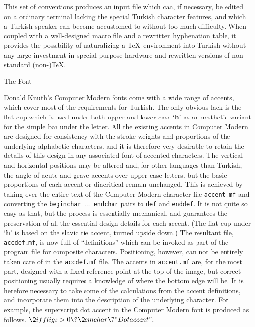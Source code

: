 This set of conventions produces an input file which can, if
necessary, be edited on a ordinary terminal lacking the special
Turkish character features, and which a Turkish speaker can become
accustomed to without too much difficulty.  When coupled with a
well-designed macro file and a rewritten hyphenation table, it
provides the possibility of naturalizing a \TeX\ environment into
Turkish without any large investment in special purpose hardware and
rewritten versions of non-standard (non-)\TeX.

\medskip
\centerline{\elevenrm The Font}
\smallskip

\noindent
Donald Knuth's Computer Modern fonts come with a wide range of accents, which
cover most of the requirements for Turkish.  The only obvious lack is
the flat cup which is used under both upper and lower case `{\bf h}' as
an aesthetic variant for the simple bar under the letter.  All the
existing accents in Computer Modern are designed for consistency 
with the stroke-weights and proportions of the underlying alphabetic
characters, and it is therefore very desirable to
retain the details of this design in any associated font of accented
characters.  The vertical and horizontal positions
may be altered and, for other languages than Turkish, the angle of
acute and grave accents over upper case letters, but the basic
proportions of each accent or diacritical remain unchanged.  This is
achieved by taking over the entire text of the Computer Modern
character file {\tt accent.mf} and converting the {\tt beginchar
$\ldots$ endchar} pairs to {\tt def} and {\tt enddef}.  It is
not quite so easy as that, but the process is essentially mechanical,
and guarantees the preservation of all the essential design details for
each accent.  (The flat cup under `{\bf h}' is based on the slavic tie
accent, turned upside down.)  The resultant file, {\tt accdef.mf}, 
is now full of ``definitions'' which can be
invoked as part of the program file for composite characters.  
Positioning, however, can not be entirely taken care of in the 
{\tt accdef.mf} file.  The accents in {\tt accent.mf} 
are, for the most part, designed with a fixed reference
point at the top of the image, but correct positioning usually
requires a knowledge of where the bottom edge will be.  It is
herefore necessary to take some of the calculations from the accent
definitions, and incorporate them into the description of the
underlying character.  For example, the superscript dot accent in the
Computer Modern font is produced as follows.
\medskip
\Beginmft
$\2{iff}\\{ligs}>0\?\2{cmchar}\7"Dot accent";$\par
